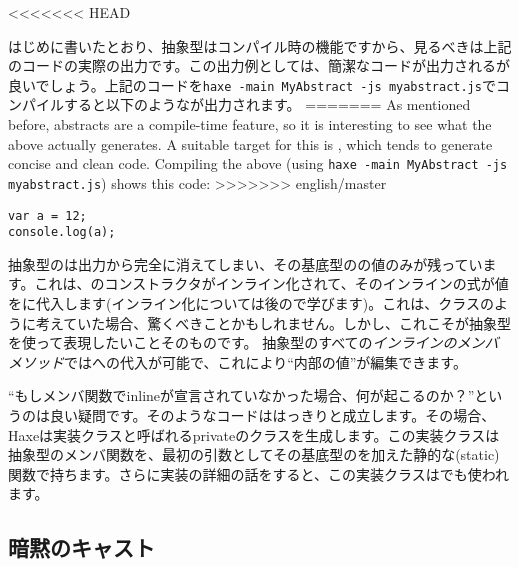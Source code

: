 <<<<<<< HEAD

はじめに書いたとおり、抽象型はコンパイル時の機能ですから、見るべきは上記のコードの実際の出力です。この出力例としては、簡潔なコードが出力されるが良いでしょう。上記のコードを\texttt{haxe -main MyAbstract -js myabstract.js}でコンパイルすると以下のようなが出力されます。
=======
As mentioned before, abstracts are a compile-time feature, so it is interesting to see what the above actually generates. A suitable target for this is , which tends to generate concise and clean code. Compiling the above (using \texttt{haxe -main MyAbstract -js myabstract.js}) shows this  code:
>>>>>>> english/master

\begin{lstlisting}
var a = 12;
console.log(a);
\end{lstlisting}

抽象型のは出力から完全に消えてしまい、その基底型のの値のみが残っています。これは、のコンストラクタがインライン化されて、そのインラインの式が値をに代入します(インライン化については後ので学びます)。これは、クラスのように考えていた場合、驚くべきことかもしれません。しかし、これこそが抽象型を使って表現したいことそのものです。
抽象型のすべての\emph{インラインのメンバメソッド}ではへの代入が可能で、これにより``内部の値''が編集できます。

``もしメンバ関数でinlineが宣言されていなかった場合、何が起こるのか？''というのは良い疑問です。そのようなコードははっきりと成立します。その場合、Haxeは実装クラスと呼ばれるprivateのクラスを生成します。この実装クラスは抽象型のメンバ関数を、最初の引数としてその基底型のを加えた静的な(static)関数で持ちます。さらに実装の詳細の話をすると、この実装クラスはでも使われます。




\subsection{暗黙のキャスト}
\label{types-abstract-implicit-casts}

